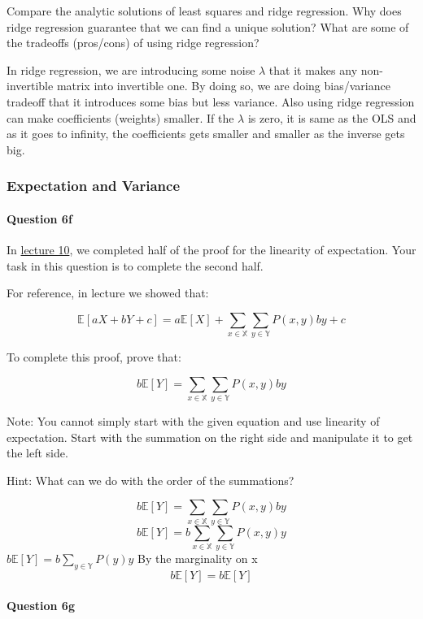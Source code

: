 \documentclass[11pt]{article}
\begin{document}
Compare the analytic solutions of least squares and ridge regression.
Why does ridge regression guarantee that we can find a unique solution?
What are some of the tradeoffs (pros/cons) of using ridge regression?

    In ridge regression, we are introducing some noise \(\lambda\) that it
makes any non-invertible matrix into invertible one. By doing so, we are
doing bias/variance tradeoff that it introduces some bias but less
variance. Also using ridge regression can make coefficients (weights)
smaller. If the \(\lambda\) is zero, it is same as the OLS and as it
goes to infinity, the coefficients gets smaller and smaller as the
inverse gets big.

    \subsubsection{Expectation and Variance}\label{expectation-and-variance}

\paragraph{Question 6f}\label{question-6f}

In \href{http://www.ds100.org/fa18/syllabus\#lecture-week-6}{lecture
10}, we completed half of the proof for the linearity of expectation.
Your task in this question is to complete the second half.

For reference, in lecture we showed that:

\[\mathbb{E}[aX + bY + c] = a\mathbb{E}[X] + \sum_{x \in \mathbb{X}}\sum_{y \in \mathbb{Y}}P(x, y)by + c\]

To complete this proof, prove that:

\[b\mathbb{E}[Y] = \sum_{x \in \mathbb{X}}\sum_{y \in \mathbb{Y}}P(x, y)by\]

Note: You cannot simply start with the given equation and use linearity
of expectation. Start with the summation on the right side and
manipulate it to get the left side.

Hint: What can we do with the order of the summations?

    \[b\mathbb{E}[Y] = \sum_{x \in \mathbb{X}}\sum_{y \in \mathbb{Y}}P(x, y)by\]
\[b\mathbb{E}[Y] = b\sum_{x \in \mathbb{X}}\sum_{y \in \mathbb{Y}}P(x, y)y\]
\(b\mathbb{E}[Y] = b\sum_{y \in \mathbb{Y}}P(y)y\) By the marginality on
x \[b\mathbb{E}[Y] = b\mathbb{E}[Y]\]

    \paragraph{Question 6g}\label{question-6g}
\end{document}
